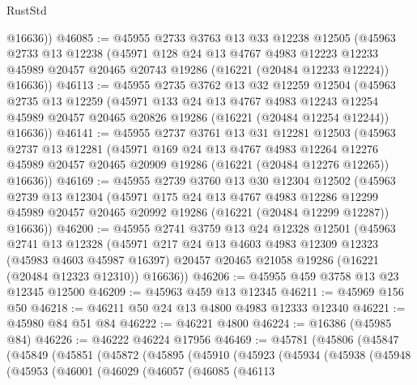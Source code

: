 \begin{lexlean}{RustStd}
\begin{coremodule}
        @16636))
@46085 := @45955
    @2733
    @3763
    @13
    @33
    @12238
    @12505
    (@45963
      @2733
      @13
      @12238
      (@45971
        @128
        @24
        @13
        @4767
        @4983
        @12223
        @12233
        @45989
        @20457
        @20465
        @20743
        @19286
        (@16221 (@20484 @12233 @12224))
        @16636))
@46113 := @45955
    @2735
    @3762
    @13
    @32
    @12259
    @12504
    (@45963
      @2735
      @13
      @12259
      (@45971
        @133
        @24
        @13
        @4767
        @4983
        @12243
        @12254
        @45989
        @20457
        @20465
        @20826
        @19286
        (@16221 (@20484 @12254 @12244))
        @16636))
@46141 := @45955
    @2737
    @3761
    @13
    @31
    @12281
    @12503
    (@45963
      @2737
      @13
      @12281
      (@45971
        @169
        @24
        @13
        @4767
        @4983
        @12264
        @12276
        @45989
        @20457
        @20465
        @20909
        @19286
        (@16221 (@20484 @12276 @12265))
        @16636))
@46169 := @45955
    @2739
    @3760
    @13
    @30
    @12304
    @12502
    (@45963
      @2739
      @13
      @12304
      (@45971
        @175
        @24
        @13
        @4767
        @4983
        @12286
        @12299
        @45989
        @20457
        @20465
        @20992
        @19286
        (@16221 (@20484 @12299 @12287))
        @16636))
@46200 := @45955
    @2741
    @3759
    @13
    @24
    @12328
    @12501
    (@45963
      @2741
      @13
      @12328
      (@45971
        @217
        @24
        @13
        @4603
        @4983
        @12309
        @12323
        (@45983 @4603 @45987 @16397)
        @20457
        @20465
        @21058
        @19286
        (@16221 (@20484 @12323 @12310))
        @16636))
@46206 := @45955 @459 @3758 @13 @23 @12345 @12500
@46209 := @45963 @459 @13 @12345
@46211 := @45969 @156 @50
@46218 := @46211 @50 @24 @13 @4800 @4983 @12333 @12340
@46221 := @45980 @84 @51 @84
@46222 := @46221 @4800
@46224 := @16386 (@45985 @84)
@46226 := @46222 @46224 @17956
@46469 := @45781
    (@45806
      (@45847
        (@45849
          (@45851
            (@45872
              (@45895
                (@45910
                  (@45923
                    (@45934
                      (@45938
                        (@45948
                          (@45953
                            (@46001
                              (@46029
                                (@46057
                                  (@46085
                                    (@46113

\end{coremodule}
\end{lexlean}
